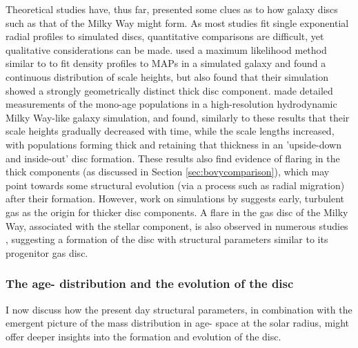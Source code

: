 Theoretical studies have, thus far, presented some clues as to how galaxy discs such as that of the Milky Way might form. As most studies fit single exponential radial profiles to simulated discs, quantitative comparisons are difficult, yet qualitative considerations can be made. \citet{2013MNRAS.436..625S} used a maximum likelihood method similar to \citet{2012ApJ...753..148B} to fit density profiles to MAPs in a simulated galaxy and found a continuous distribution of scale heights, but also found that their simulation showed a strongly geometrically distinct thick disc component. \citet{2013ApJ...773...43B} made detailed measurements of the mono-age populations in a high-resolution hydrodynamic Milky Way-like galaxy simulation, and found, similarly to these results that their scale heights gradually decreased with time, while the scale lengths increased, with populations forming thick and retaining that thickness in an 'upside-down and inside-out' disc formation. These results also find evidence of flaring in the thick components (as discussed in Section \ref{sec:bovycomparison}), which may point towards some structural evolution (via a process such as radial migration) after their formation. However, work on simulations by \citet{2009ApJ...707L...1B}  suggests early, turbulent gas as the origin for thicker disc components. A flare in the gas disc of the Milky Way, associated with the stellar component, is also observed in numerous studies \citep[e.g.][]{2014Natur.509..342F,2014ApJ...794...90K,1963SvA.....6..658L}, suggesting a formation of the disc with structural parameters similar to its progenitor gas disc.
 
\subsubsection{The age-\feh{} distribution and the evolution of the disc}
I now discuss how the present day structural parameters, in combination with the emergent picture of the mass distribution in age-\feh{} space at the solar radius, might offer deeper insights into the formation and evolution of the disc. 

